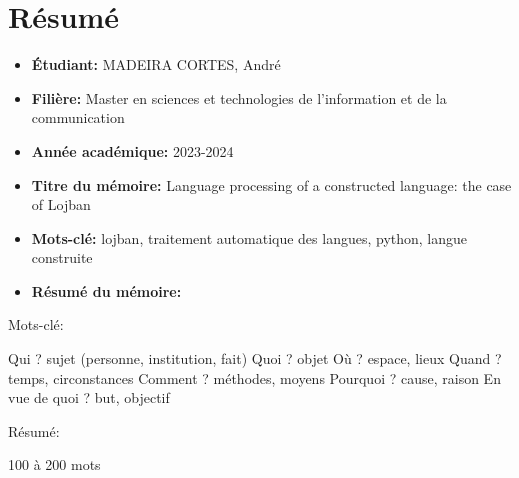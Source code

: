 \section*{Résumé} %
\label{sec:resume}


\begin{itemize}
    \item \textbf{Étudiant:} MADEIRA CORTES, André
    \item \textbf{Filière:} Master en sciences et technologies de l'information et de la communication
    \item \textbf{Année académique:} 2023-2024
    \item \textbf{Titre du mémoire:} Language processing of a constructed language: the case of Lojban
    \item \textbf{Mots-clé:} lojban, traitement automatique des langues, python, langue construite
    \item \textbf{Résumé du mémoire:}
\end{itemize}

Mots-clé:

Qui ?              sujet (personne, institution, fait)
Quoi ?             objet
Où ?               espace, lieux
Quand ?            temps, circonstances
Comment ?          méthodes, moyens
Pourquoi ?         cause, raison
En vue de quoi ?   but, objectif

Résumé:

100 à 200 mots